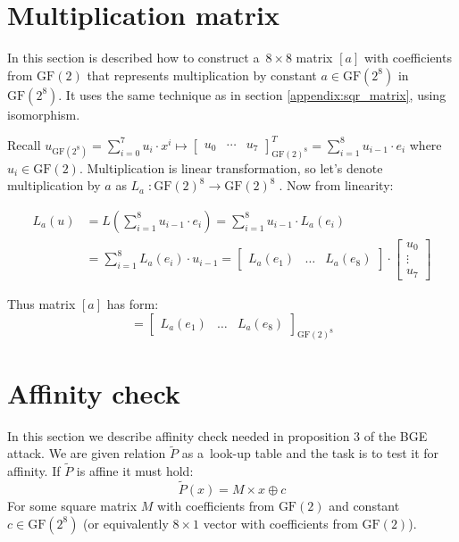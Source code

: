 \documentclass[11pt,oneside,final]{fithesis2}
\newcommand{\gfe}{\ensuremath{\text{GF}\left(2^8\right)}}
\newcommand{\gf}{\ensuremath{\text{GF}\left(2\right)}}
\begin{document}
    \section{Multiplication matrix}\label{appendix:mult_matrix}
    In this section is described how to construct a~$8 \times 8$ matrix $[a]$ with coefficients from $\gf$ that represents multiplication by 
    constant $a \in \gfe$ in $\gfe$. It uses the same technique as in section \ref{appendix:sqr_matrix}, using isomorphism.
    
    Recall $u_{\gfe} = \sum_{i=0}^{7} u_i \cdot x^i \mapsto \begin{bmatrix} u_0 & \cdots & u_7\end{bmatrix}^T_{\gf^8} = \sum_{i=1}^8 u_{i-1} \cdot e_i$
    where $u_i \in \gf$. Multiplication is linear transformation, so let's denote multiplication by $a$ as $L_a \; : \gf^8 \rightarrow \gf^8\; $.
    Now from linearity: 
    
    \begin{align*}
	L_a(u) &= L\left(\sum_{i=1}^8 u_{i-1} \cdot e_i\right) = \sum_{i=1}^8 u_{i-1} \cdot L_a(e_i) \\
	       &= \sum_{i=1}^8 L_a(e_i) \cdot u_{i-1} 
	        = \begin{bmatrix} L_a\left(e_1\right) & \dots & L_a\left(e_8\right) \end{bmatrix} \cdot 
		  \begin{bmatrix} 
		    u_0\\
		    \vdots\\
		    u_7
		  \end{bmatrix} 
    \end{align*}
    
    Thus matrix $[a]$ has form:
    \begin{equation*}
     [a] = \begin{bmatrix} L_a\left(e_1\right) & \dots & L_a\left(e_8\right) \end{bmatrix}_{\gf^8}
    \end{equation*}


    \section{Affinity check}\label{appendix:affcheck}
    In this section we describe affinity check needed in proposition 3 of the BGE attack. We are given relation $\widetilde{P}$ as a~look-up table
    and the task is to test it for affinity. If $\widetilde{P}$ is affine it must hold:
    \begin{equation}
	\widetilde{P}\left(x\right) = M \times x \oplus c
    \end{equation}
    For some square matrix $M$ with coefficients from $\text{GF}(2)$ and constant $c \in \gfe$ (or equivalently $8\times1$ vector with coefficients from $\text{GF}(2)$).\\
    
\end{document}
